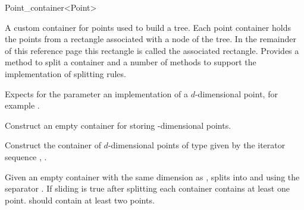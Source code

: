 

\begin{ccRefClass}{Point_container<Point>}  %






\ccDefinition
A custom container for points used to build a tree. Each point container
holds the points from a rectangle associated with a node of the tree.
In the remainder of this reference page this rectangle is called the
associated rectangle.
Provides a method to split a container and a number of methods
to support the implementation of splitting rules.


\ccParameters

Expects for the parameter  an implementation of 
a $d$-dimensional point, for example .

\ccTypes


\ccCreation
{}

{
Construct an empty container for storing -dimensional points.
}

{
Construct the container of $d$-dimensional points of type 
given by the iterator sequence , .
}



\ccOperations

{Given an empty container  with the same dimension as , splits  into
 and  using the separator . If sliding is true after splitting 
each container contains at least one point.  should contain at least two points.}



\end{ccRefClass}
